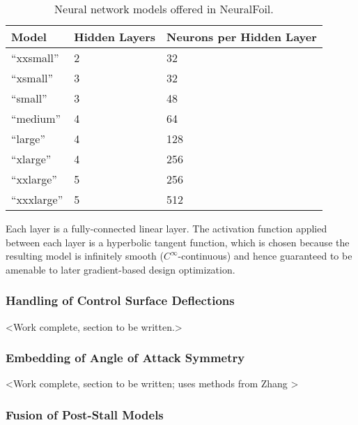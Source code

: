 \documentclass[conf]{new-aiaa}
\begin{document}
    \begin{table}
        \centering
        \caption{Neural network models offered in NeuralFoil.}
        \label{tab:model-sizes}
        \begin{tabular}{lll}
            \toprule
            Model        & Hidden Layers & Neurons per Hidden Layer \\ \midrule
            ``xxsmall''  & 2             & 32                       \\
            ``xsmall''   & 3             & 32                       \\
            ``small''    & 3             & 48                       \\
            ``medium''   & 4             & 64                       \\
            ``large''    & 4             & 128                      \\
            ``xlarge''   & 4             & 256                      \\
            ``xxlarge''  & 5             & 256                      \\
            ``xxxlarge'' & 5             & 512                      \\
            \bottomrule
        \end{tabular}
    \end{table}

    Each layer is a fully-connected linear layer. The activation function applied between each layer is a hyperbolic tangent function, which is chosen because the resulting model is infinitely smooth ($C^\infty$-continuous) and hence guaranteed to be amenable to later gradient-based design optimization.

    \subsubsection{Handling of Control Surface Deflections}
    \label{sec:control-surfaces}

    <Work complete, section to be written.>

    \subsubsection{Embedding of Angle of Attack Symmetry}

    <Work complete, section to be written; uses methods from Zhang \cite{zhang_threedimensional_2022}>

    \subsubsection{Fusion of Post-Stall Models}
\end{document}
